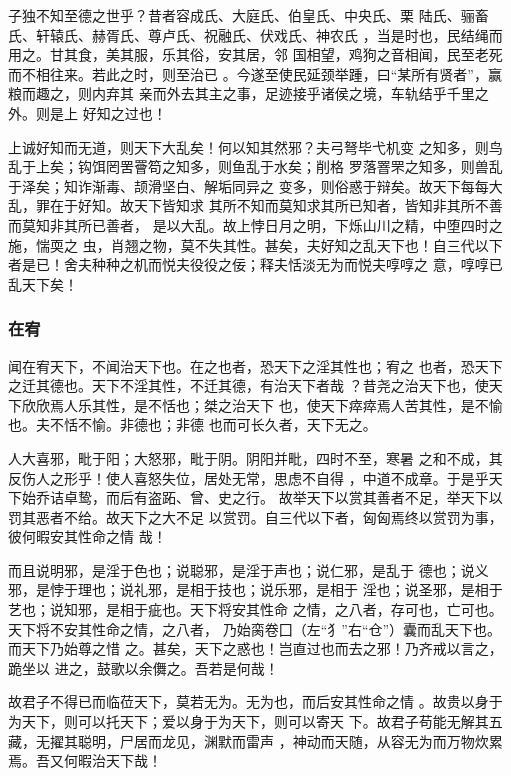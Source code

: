 \documentclass[]{article}
\begin{document}
子独不知至德之世乎？昔者容成氏、大庭氏、伯皇氏、中央氏、栗
陆氏、骊畜氏、轩辕氏、赫胥氏、尊卢氏、祝融氏、伏戏氏、神农氏
，当是时也，民结绳而用之。甘其食，美其服，乐其俗，安其居，邻
国相望，鸡狗之音相闻，民至老死而不相往来。若此之时，则至治已
。今遂至使民延颈举踵，曰``某所有贤者''，赢粮而趣之，则内弃其
亲而外去其主之事，足迹接乎诸侯之境，车轨结乎千里之外。则是上
好知之过也！

上诚好知而无道，则天下大乱矣！何以知其然邪？夫弓弩毕弋机变
之知多，则鸟乱于上矣；钩饵罔罟罾笱之知多，则鱼乱于水矣；削格
罗落罯罘之知多，则兽乱于泽矣；知诈渐毒、颉滑坚白、解垢同异之
变多，则俗惑于辩矣。故天下每每大乱，罪在于好知。故天下皆知求
其所不知而莫知求其所已知者，皆知非其所不善而莫知非其所已善者，
是以大乱。故上悖日月之明，下烁山川之精，中堕四时之施，惴耎之
虫，肖翘之物，莫不失其性。甚矣，夫好知之乱天下也！自三代以下
者是已！舍夫种种之机而悦夫役役之佞；释夫恬淡无为而悦夫啍啍之
意，啍啍已乱天下矣！

\hypertarget{header-n2121}{%
\subsubsection{在宥}\label{header-n2121}}

闻在宥天下，不闻治天下也。在之也者，恐天下之淫其性也；宥之
也者，恐天下之迁其德也。天下不淫其性，不迁其德，有治天下者哉
？昔尧之治天下也，使天下欣欣焉人乐其性，是不恬也；桀之治天下
也，使天下瘁瘁焉人苦其性，是不愉也。夫不恬不愉。非德也；非德
也而可长久者，天下无之。

人大喜邪，毗于阳；大怒邪，毗于阴。阴阳并毗，四时不至，寒暑
之和不成，其反伤人之形乎！使人喜怒失位，居处无常，思虑不自得
，中道不成章。于是乎天下始乔诘卓鸷，而后有盗跖、曾、史之行。
故举天下以赏其善者不足，举天下以罚其恶者不给。故天下之大不足
以赏罚。自三代以下者，匈匈焉终以赏罚为事，彼何暇安其性命之情 哉！

而且说明邪，是淫于色也；说聪邪，是淫于声也；说仁邪，是乱于
德也；说义邪，是悖于理也；说礼邪，是相于技也；说乐邪，是相于
淫也；说圣邪，是相于艺也；说知邪，是相于疵也。天下将安其性命
之情，之八者，存可也，亡可也。天下将不安其性命之情，之八者，
乃始脔卷囗（左``犭''右``仓''）囊而乱天下也。而天下乃始尊之惜
之。甚矣，天下之惑也！岂直过也而去之邪！乃齐戒以言之，跪坐以
进之，鼓歌以余儛之。吾若是何哉！

故君子不得已而临莅天下，莫若无为。无为也，而后安其性命之情
。故贵以身于为天下，则可以托天下；爱以身于为天下，则可以寄天
下。故君子苟能无解其五藏，无擢其聪明，尸居而龙见，渊默而雷声
，神动而天随，从容无为而万物炊累焉。吾又何暇治天下哉！
\end{document}
